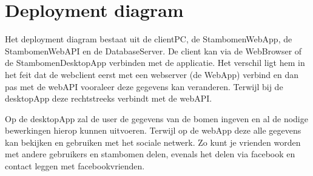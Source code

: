 \documentclass[pdftex,a4paper,12pt,twoside]{report}
\begin{document}
\section{Deployment diagram}
Het deployment diagram bestaat uit de clientPC, de StambomenWebApp, de StambomenWebAPI en de DatabaseServer.
De client kan via de WebBrowser of de StambomenDesktopApp verbinden met de applicatie. Het verschil ligt hem in het feit dat de webclient eerst met een webserver (de WebApp) verbind  en dan pas met de webAPI vooraleer deze gegevens kan veranderen. Terwijl bij de desktopApp deze rechtstreeks verbindt met de webAPI.

Op de desktopApp zal de user de gegevens van de bomen ingeven en al de nodige bewerkingen hierop kunnen uitvoeren. Terwijl op de webApp deze alle gegevens kan bekijken en gebruiken met het sociale netwerk. Zo kunt je vrienden worden met andere gebruikers en stambomen delen, evenals het delen via facebook en contact leggen met facebookvrienden.
\end{document}
